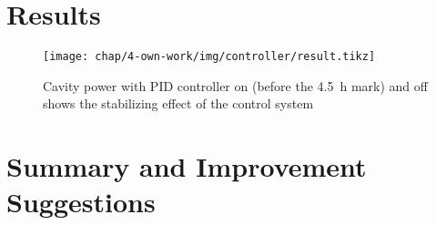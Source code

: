 \FloatBarrier
\section{Results}

\begin{figure}[tb]
	\centering
	\texttt{[image: chap/4-own-work/img/controller/result.tikz]}
	\caption{Cavity power with PID controller on (before the \SI{4.5}{\hour} mark) and off shows the stabilizing effect of the control system}
	\label{fig:own-work-pid-result}
\end{figure}

\FloatBarrier
\section{Summary and Improvement Suggestions}